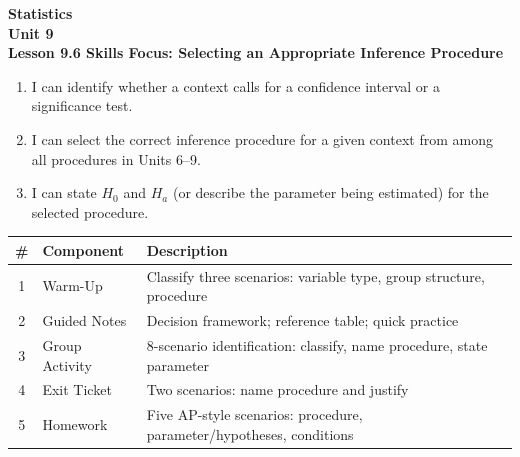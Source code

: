\documentclass[10pt]{article}
\begin{document}
\vspace{-0.8in}

\begin{center}
  {\color{white}\textbf{\LARGE Statistics}}\\[4pt]
  {\color{skymid}\large\textbf{Unit 9}}\\[6pt]
  {\color{white}\textbf{\large Lesson 9.6 \quad Skills Focus: Selecting an Appropriate Inference Procedure}}
\end{center}

\vspace{0.22in}
\namedateperiod
\vspace{0.18in}

\begin{learningtargetbox}
\small
\begin{enumerate}[leftmargin=1.5em, itemsep=5pt]
  \item I can identify whether a context calls for a confidence interval or a significance test.
  \item I can select the correct inference procedure for a given context from among all
        procedures in Units 6--9.
  \item I can state $H_0$ and $H_a$ (or describe the parameter being estimated) for the
        selected procedure.
\end{enumerate}
\end{learningtargetbox}

\vspace{0.14in}

\begin{tocbox}
\small
\renewcommand{\arraystretch}{1.5}
\begin{tabularx}{\linewidth}{@{} c l X @{}}
\rowcolor{sky}
\textbf{\#} & \textbf{Component} & \textbf{Description} \\
\midrule
1 & Warm-Up        & Classify three scenarios: variable type, group structure, procedure \\
2 & Guided Notes   & Decision framework; reference table; quick practice \\
3 & Group Activity & 8-scenario identification: classify, name procedure, state parameter \\
4 & Exit Ticket    & Two scenarios: name procedure and justify \\
5 & Homework       & Five AP-style scenarios: procedure, parameter/hypotheses, conditions \\
\end{tabularx}
\end{tocbox}
\end{document}
